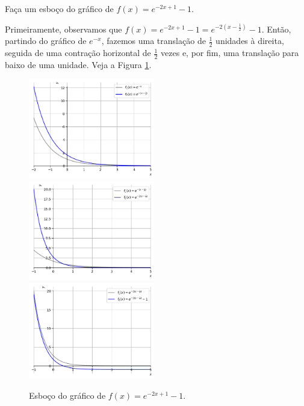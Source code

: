 \begin{exeresol}
  Faça um esboço do gráfico de $f(x) = e^{-2x+1}-1$.
\end{exeresol}
\begin{resol}
  Primeiramente, observamos que $f(x) = e^{-2x+1}-1 = e^{-2\left(x-\frac{1}{2}\right)}-1$. Então, partindo do gráfico de $e^{-x}$, fazemos uma translação de $\frac{1}{2}$ unidades à direita, seguida de uma contração horizontal de $\frac{1}{2}$ vezes e, por fim, uma translação para baixo de uma unidade. Veja a Figura \ref{fig:exeresol_funexp_graf}.

  \begin{figure}[H]
    \centering
    \includegraphics[width=0.49\textwidth]{./cap_funcao/dados/fig_exeresol_funexp_graf/fig_exeresol_funexp_graf_1}~
    \includegraphics[width=0.49\textwidth]{./cap_funcao/dados/fig_exeresol_funexp_graf/fig_exeresol_funexp_graf_2}\\
    \includegraphics[width=0.49\textwidth]{./cap_funcao/dados/fig_exeresol_funexp_graf/fig_exeresol_funexp_graf_3}
    \caption{Esboço do gráfico de $f(x) = e^{-2x+1}-1$.}
    \label{fig:exeresol_funexp_graf}
  \end{figure}
\end{resol}

